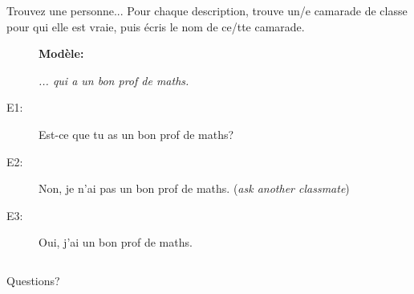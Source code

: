 \documentclass{beamer}
\begin{document}
  \begin{frame}{Trouvez une personne...}
    Pour chaque description, trouve un/e camarade de classe pour qui elle est vraie, puis écris le nom de ce/tte camarade. \\
    \begin{center}
      \begin{description}
        \item[] \textbf{Modèle:}
        \item[] \emph{... qui a un bon prof de maths.}
        \item[E1:] Est-ce que tu as un bon prof de maths?
        \item[E2:] Non, je n'ai pas un bon prof de maths. (\emph{ask another classmate})
        \item[E3:] Oui, j'ai un bon prof de maths.
      \end{description}
    \end{center}
    \begin{columns}
      
    \end{columns}
  \end{frame}

  \begin{frame}{}
    \begin{center}
      \Large Questions?
    \end{center}
  \end{frame}
\end{document}
